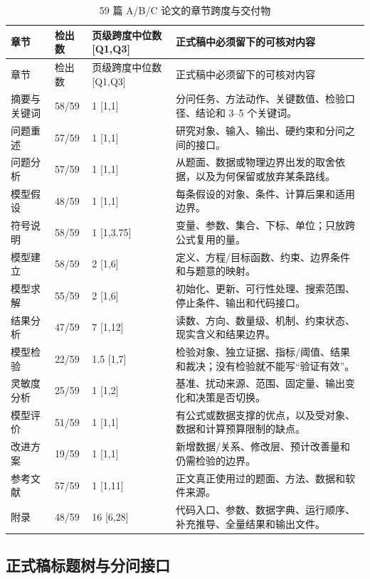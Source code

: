 \documentclass[UTF8,zihao=-4]{ctexart}
\begin{document}
\begin{longtable}{p{2.3cm}p{1.5cm}p{3.0cm}p{8.0cm}}
\caption{59 篇 A/B/C 论文的章节跨度与交付物}\label{tab:template-corpus-length}\\
\toprule
章节 & 检出数 & 页级跨度中位数 [Q1,Q3] & 正式稿中必须留下的可核对内容\\
\midrule
\endfirsthead
\toprule
章节 & 检出数 & 页级跨度中位数 [Q1,Q3] & 正式稿中必须留下的可核对内容\\
\midrule
\endhead
摘要与关键词 & 58/59 & 1 [1,1] & 分问任务、方法动作、关键数值、检验口径、结论和 3--5 个关键词。\\
问题重述 & 57/59 & 1 [1,1] & 研究对象、输入、输出、硬约束和分问之间的接口。\\
问题分析 & 57/59 & 1 [1,1] & 从题面、数据或物理边界出发的取舍依据，以及为何保留或放弃某条路线。\\
模型假设 & 48/59 & 1 [1,1] & 每条假设的对象、条件、计算后果和适用边界。\\
符号说明 & 58/59 & 1 [1,3.75] & 变量、参数、集合、下标、单位；只放跨公式复用的量。\\
模型建立 & 58/59 & 2 [1,6] & 定义、方程/目标函数、约束、边界条件和与题意的映射。\\
模型求解 & 55/59 & 2 [1,6] & 初始化、更新、可行性处理、搜索范围、停止条件、输出和代码接口。\\
结果分析 & 47/59 & 7 [1,12] & 读数、方向、数量级、机制、约束状态、现实含义和结果边界。\\
模型检验 & 22/59 & 1.5 [1,7] & 检验对象、独立证据、指标/阈值、结果和裁决；没有检验就不能写“验证有效”。\\
灵敏度分析 & 25/59 & 1 [1,2] & 基准、扰动来源、范围、固定量、输出变化和决策是否切换。\\
模型评价 & 51/59 & 1 [1,1] & 有公式或数据支撑的优点，以及受对象、数据和计算预算限制的缺点。\\
改进方案 & 19/59 & 1 [1,1] & 新增数据/关系、修改层、预计改善量和仍需检验的边界。\\
参考文献 & 57/59 & 1 [1,11] & 正文真正使用过的题面、方法、数据和软件来源。\\
附录 & 48/59 & 16 [6,28] & 代码入口、参数、数据字典、运行顺序、补充推导、全量结果和输出文件。\\
\bottomrule
\end{longtable}

\subsection{正式稿标题树与分问接口}
\end{document}
